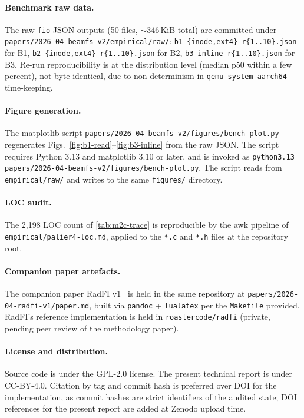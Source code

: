 \paragraph{Benchmark raw data.}
The raw \texttt{fio} JSON outputs (50 files, \(\sim\)346\,KiB
total) are committed under
\texttt{papers/2026-04-beamfs-v2/empirical/raw/}:
\texttt{b1-\{inode,ext4\}-r\{1..10\}.json} for B1,
\texttt{b2-\{inode,ext4\}-r\{1..10\}.json} for B2,
\texttt{b3-inline-r\{1..10\}.json} for B3. Re-run reproducibility
is at the distribution level (median p50 within a few percent),
not byte-identical, due to non-determinism in
\texttt{qemu-system-aarch64} time-keeping.

\paragraph{Figure generation.}
The matplotlib script
\texttt{papers/2026-04-beamfs-v2/figures/bench-plot.py}
regenerates Figs.~\ref{fig:b1-read}--\ref{fig:b3-inline} from the
raw JSON. The script requires Python 3.13 and matplotlib 3.10 or
later, and is invoked as \texttt{python3.13
papers/2026-04-beamfs-v2/figures/bench-plot.py}. The script reads
from \texttt{empirical/raw/} and writes to the same
\texttt{figures/} directory.

\paragraph{LOC audit.}
The 2{,}198 LOC count of \cref{tab:m2c-trace} is reproducible by
the awk pipeline of
\texttt{empirical/palier4-loc.md}, applied to the \texttt{*.c}
and \texttt{*.h} files at the repository root.

\paragraph{Companion paper artefacts.}
The companion paper RadFI v1~\cite{desbrieres2026radfi} is held
in the same repository at
\texttt{papers/2026-04-radfi-v1/paper.md}, built via
\texttt{pandoc} + \texttt{lualatex} per the
\texttt{Makefile} provided. RadFI's reference implementation is
held in \texttt{roastercode/radfi} (private, pending peer review
of the methodology paper).

\paragraph{License and distribution.}
Source code is under the GPL-2.0 license. The present technical
report is under CC-BY-4.0. Citation by tag and commit hash is
preferred over DOI for the implementation, as commit hashes are
strict identifiers of the audited state; DOI references for the
present report are added at Zenodo upload time.
